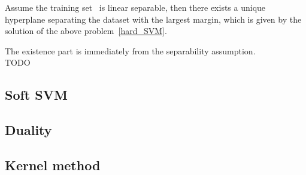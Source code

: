 \begin{thm}
    Assume the training set \dataset\ is linear separable, then there exists a unique hyperplane separating
    the dataset with the largest margin, which is given by the solution of the above 
    problem~\eqref{hard_SVM}.
\end{thm}
\begin{pf}
    The existence part is immediately from the separability assumption.\\
    TODO
\end{pf}

\subsection{Soft SVM}

\subsection{Duality}

\subsection{Kernel method}